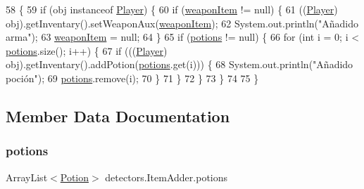 \begin{DoxyCode}
58                                        \{
59         \textcolor{keywordflow}{if} (obj instanceof \mbox{\hyperlink{classentities_1_1_player}{Player}}) \{
60             \textcolor{keywordflow}{if} (\mbox{\hyperlink{classdetectors_1_1_item_adder_ac322ec31bdcfdcc3039e8d0ecc8d530f}{weaponItem}} != null) \{
61                 ((\mbox{\hyperlink{classentities_1_1_player}{Player}}) obj).getInventary().setWeaponAux(\mbox{\hyperlink{classdetectors_1_1_item_adder_ac322ec31bdcfdcc3039e8d0ecc8d530f}{weaponItem}});
62                 System.out.println(\textcolor{stringliteral}{"Añadido arma"});
63                 \mbox{\hyperlink{classdetectors_1_1_item_adder_ac322ec31bdcfdcc3039e8d0ecc8d530f}{weaponItem}} = null;
64             \}
65             \textcolor{keywordflow}{if} (\mbox{\hyperlink{classdetectors_1_1_item_adder_a26e510502039e2245428cf040fafbd9c}{potions}} != null) \{
66                 \textcolor{keywordflow}{for} (\textcolor{keywordtype}{int} i = 0; i < \mbox{\hyperlink{classdetectors_1_1_item_adder_a26e510502039e2245428cf040fafbd9c}{potions}}.size(); i++) \{
67                     \textcolor{keywordflow}{if} (((\mbox{\hyperlink{classentities_1_1_player}{Player}}) obj).getInventary().addPotion(\mbox{\hyperlink{classdetectors_1_1_item_adder_a26e510502039e2245428cf040fafbd9c}{potions}}.get(i))) \{
68                         System.out.println(\textcolor{stringliteral}{"Añadido poción"});
69                         \mbox{\hyperlink{classdetectors_1_1_item_adder_a26e510502039e2245428cf040fafbd9c}{potions}}.remove(i);
70                     \}
71                 \}
72             \}
73         \}
74 
75     \}
\end{DoxyCode}


\subsection{Member Data Documentation}
\mbox{\label{classdetectors_1_1_item_adder_a26e510502039e2245428cf040fafbd9c}} 
\subsubsection{\texorpdfstring{potions}{potions}}
{\footnotesize\ttfamily Array\+List$<$\mbox{\hyperlink{classitems_1_1_potion}{Potion}}$>$ detectors.\+Item\+Adder.\+potions\hspace{0.3cm}{\ttfamily [private]}}


